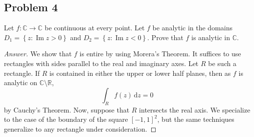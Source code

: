 \documentclass[12pt]{article}
\newcommand{\cx}{\mathbb{C}}
\newcommand{\real}{\mathbb{R}}
\newcommand\setb[1]{\left \{ #1 \right \}}
\renewcommand{\i}[4]{\int_{#1}^{#2} {#3} \, \mathrm{d} {#4} }
\theoremstyle{definition}
\DeclareMathOperator\im{Im}
\begin{document}
\subsection{Problem 4}
Let $f : \cx \to \cx$ be continuous at every point. Let $f$ be analytic in the domains $D_1 = \setb{z : \im z > 0 }$ and $D_2 = \setb{ z : \im z < 0 }$. Prove that $f$ is analytic in $\cx$. 
\begin{proof}[Answer]
    We show that $f$ is entire by using Morera's Theorem. It suffices to use rectangles with sides parallel to the real and imaginary axes. Let $R$ be such a rectangle. If $R$ is contained in either the upper or lower half planes, then as $f$ is analytic on $\cx \setminus \real$, 
    \[
        \i{R}{}{f(z)}{z} = 0 
    \]
    by Cauchy's Theorem. Now, suppose that $R$ intersects the real axis. We specialize to the case of the boundary of the square $[-1,1]^2$, but the same techniques generalize to any rectangle under consideration. 
    

\end{proof}
\end{document}
